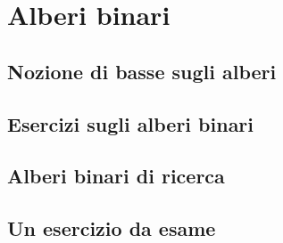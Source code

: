 \chapter{Alberi binari}

\section{Nozione di basse sugli alberi}

\section{Esercizi sugli alberi binari}

\section{Alberi binari di ricerca}

\section{Un esercizio da esame}

